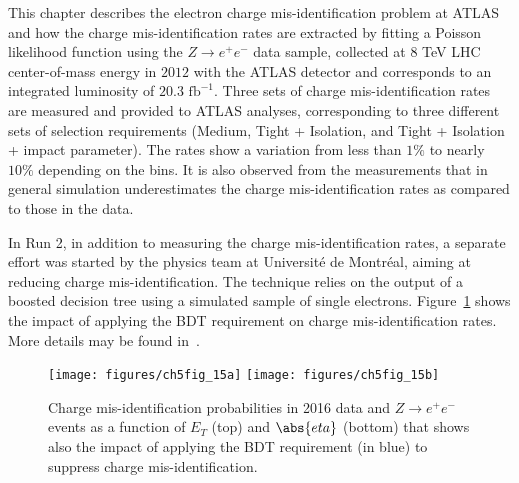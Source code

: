 This chapter describes the electron charge mis-identification problem at ATLAS
and how the charge mis-identification rates are extracted by fitting a Poisson
likelihood function using the $Z\to e^+e^-$ data sample, collected at $8$ TeV
LHC center-of-mass energy in $2012$ with the ATLAS detector and corresponds to
an integrated luminosity of $20.3$ $\text{fb}^{-1}$. Three sets of charge
mis-identification rates are measured and provided to ATLAS analyses,
corresponding to three different sets of selection requirements (Medium, Tight
+ Isolation, and Tight + Isolation + impact parameter). The rates show a
variation from less than $1\%$ to nearly $10\%$ depending on the bins. It is
also observed from the measurements that in general simulation underestimates
the charge mis-identification rates as compared to those in the data.

In Run 2, in addition to measuring the charge mis-identification rates, a
separate effort was started by the physics team at Universit\'{e} de
Montr\'{e}al, aiming at reducing charge mis-identification. The technique
relies on the output of a boosted decision tree using a simulated sample of
single electrons. Figure~\ref{f:meeratesbdt} shows the impact of applying the
BDT requirement on charge mis-identification rates. More details may be found
in~\cite{atlaselcid}.

\begin{figure}[H]
	\texttt{[image: figures/ch5fig\_15a]}
	\texttt{[image: figures/ch5fig\_15b]}
	\centering

	\caption{Charge mis-identification probabilities in 2016 data and $Z\to e^+e^-$ 
	events as a function of $E_T$ (top) and $\abs{eta}$ (bottom) that shows also 
	the impact of applying the BDT requirement (in blue) to suppress charge mis-identification. 
	}

	\label{f:meeratesbdt}
\end{figure}
